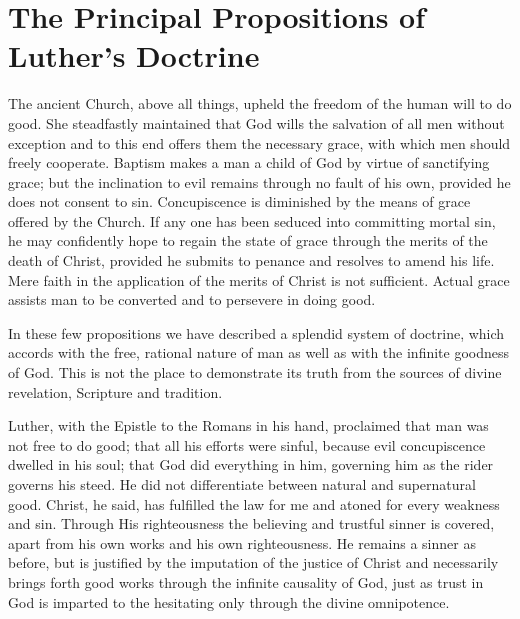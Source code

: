 \section{The Principal Propositions of Luther’s Doctrine}

The ancient Church, above all things, upheld the freedom of the
human will to do good. She steadfastly maintained that God wills
the salvation of all men without exception and to this end offers
them the necessary grace, with which men should freely cooperate.
Baptism makes a man a child of God by virtue of sanctifying grace;
but the inclination to evil remains through no fault of his own, provided
he does not consent to sin. Concupiscence is diminished by the
means of grace offered by the Church. If any one has been seduced
into committing mortal sin, he may confidently hope to regain the
state of grace through the merits of the death of Christ, provided he
submits to penance and resolves to amend his life. Mere faith in the
application of the merits of Christ is not sufficient. Actual grace
assists man to be converted and to persevere in doing good.

In these few propositions we have described a splendid system
of doctrine, which accords with the free, rational nature of man
as well as with the infinite goodness of God. This is not the place to
demonstrate its truth from the sources of divine revelation, Scripture
and tradition.

Luther, with the Epistle to the Romans in his hand, proclaimed
that man was not free to do good; that all his efforts were sinful,
because evil concupiscence dwelled in his soul; that God did everything
in him, governing him as the rider governs his steed. He did
not differentiate between natural and supernatural good. Christ,
he said, has fulfilled the law for me and atoned for every weakness
and sin. Through His righteousness the believing and trustful sinner
is covered, apart from his own works and his own righteousness. He
remains a sinner as before, but is justified by the imputation of the
justice of Christ and necessarily brings forth good works through
the infinite causality of God, just as trust in God is imparted to the
hesitating only through the divine omnipotence.

